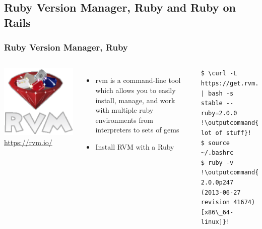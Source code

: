 \documentclass{beamer}
\newcommand{\outputcommand}[1]{\color{darkgreen}{#1}}
\begin{document}
\subsection{Ruby Version Manager, Ruby and Ruby on Rails}
\begin{frame}[fragile]
\frametitle{Ruby Version Manager, Ruby}
\begin{columns}
\href{https://rvm.io/}{\includegraphics[width = 1.0 \textwidth]{rvm.eps}}
\url{https://rvm.io/}
\begin{itemize}
\item \acrfull{rvm} is a command-line tool which allows you to easily install, manage, and work with multiple ruby environments from interpreters to sets of gems
\item Install RVM with a Ruby
\end{itemize}
\lstset{language=shell, escapechar=!}
\begin{lstlisting}[escapechar=!]
$ \curl -L https://get.rvm.io | bash -s stable --ruby=2.0.0
!\outputcommand{A lot of stuff}!
$ source ~/.bashrc
$ ruby -v
!\outputcommand{ruby 2.0.0p247 (2013-06-27 revision 41674) [x86\_64-linux]}!
\end{lstlisting}
\end{columns}
\end{frame}
\end{document}
